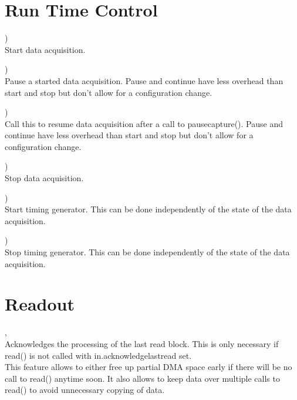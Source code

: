 
\section{Run Time Control}
	\device)\\
	Start data acquisition.\par

	\device)\\
	Pause a started data acquisition. 
	Pause and continue have less overhead than start and stop but don't allow for a configuration change.\par

	\device)\\
	Call this to resume data acquisition after a call to \textsf{\prefix pause\tu capture()}.
	Pause and continue have less overhead than start and stop but don't allow for a configuration change.\par

	\device)\\
	Stop data acquisition.\par

	\device)\\
	Start timing generator. This can be done independently of the state of the data acquisition.\par

	\device)\\
	Stop timing generator. This can be done independently of the state of the data acquisition.\par

\section{Readout}
	\device, \\
	Acknowledges the processing of the last read block. This is only necessary if \textsf{\prefix read()} is not called with 
	\textsf{in.acknowledge\tu last\tu read} set.\\
	This feature allows to either free up partial DMA space early if there will be no call to \textsf{\prefix read()} anytime soon. 
	It also allows to keep data over multiple calls to \textsf{\prefix read()} to avoid unnecessary copying of data. \par


